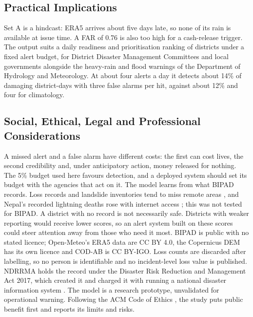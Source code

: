 \documentclass[conference]{IEEEtran}
\begin{document}
\subsection{Practical Implications}
Set A is a hindcast: ERA5 arrives about five days late, so none of its rain is available at issue time. A FAR of 0.76 is also too high for a cash-release trigger. The output suits a daily readiness and prioritisation ranking of districts under a fixed alert budget, for District Disaster Management Committees and local governments alongside the heavy-rain and flood warnings of the Department of Hydrology and Meteorology. At about four alerts a day it detects about 14\% of damaging district-days with three false alarms per hit, against about 12\% and four for climatology.

\subsection{Social, Ethical, Legal and Professional Considerations}
\label{sec:ethics}
A missed alert and a false alarm have different costs: the first can cost lives, the second credibility and, under anticipatory action, money released for nothing. The 5\% budget used here favours detection, and a deployed system should set its budget with the agencies that act on it. The model learns from what BIPAD records. Loss records and landslide inventories tend to miss remote areas \cite{Gall2009,Harvey2024}, and Nepal's recorded lightning deaths rose with internet access \cite{Adhikari2021}; this was not tested for BIPAD. A district with no record is not necessarily safe. Districts with weaker reporting would receive lower scores, so an alert system built on these scores could steer attention away from those who need it most. BIPAD is public with no stated licence; Open-Meteo's ERA5 data are CC BY 4.0, the Copernicus DEM has its own licence and COD-AB is CC BY-IGO. Loss counts are discarded after labelling, so no person is identifiable and no incident-level loss value is published. NDRRMA holds the record under the Disaster Risk Reduction and Management Act 2017, which created it and charged it with running a national disaster information system \cite{DRRMAct2017}. The model is a research prototype, unvalidated for operational warning. Following the ACM Code of Ethics \cite{ACM2018}, the study puts public benefit first and reports its limits and risks.
\end{document}
